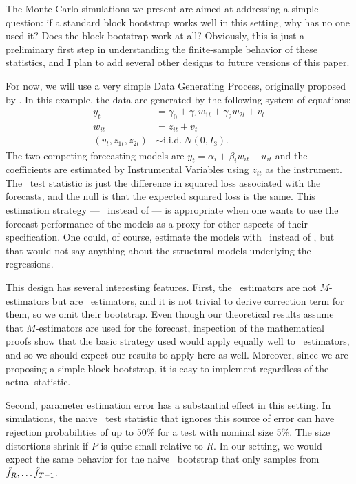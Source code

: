 \documentclass[12pt,fleqn]{article}
\begin{document}
The Monte Carlo simulations we present are aimed at addressing a
simple question: if a standard block bootstrap works well in this
setting, why has no one used it? Does the block bootstrap work at all?
Obviously, this is just a preliminary first step in understanding the
finite-sample behavior of these statistics, and I plan to add several
other designs to future versions of this paper.

For now, we will use a very simple Data Generating Process, originally
proposed by \cite{Wes:96}. In this example, the data are generated by
the following system of equations:
\begin{align*}
  y_t &= \gamma_0 + \gamma_1 w_{1t} + \gamma_2 w_{2t} + v_t \\
  w_{it} &= z_{it} + v_t \\
  (v_t, z_{1t}, z_{2t}) &\sim \text{i.i.d.}\ N(0, I_3).
\end{align*}
The two competing forecasting models are $y_t = \alpha_i + \beta_i
w_{it} + u_{it}$ and the coefficients are estimated by Instrumental
Variables using $z_{it}$ as the instrument. The \oos\ test statistic
is just the difference in squared loss associated with the forecasts,
and the null is that the expected squared loss is the same.  This
estimation strategy --- \iv\ instead of \ols --- is appropriate when
one wants to use the forecast performance
of the models as a proxy for other aspects of their specification. One
could, of course, estimate the models with \ols\ instead of \iv, but
that would not say anything about the structural models underlying the
regressions.

This design has several interesting features. First, the \iv\
estimators are not $M$-estimators but are \gmm\ estimators, and it is
not trivial to derive \citepos{CoS:07} correction term for them, so we
omit their bootstrap. Even though
our theoretical results assume that $M$-estimators are used for the
forecast, inspection of the mathematical proofs show that the basic
strategy used would apply equally well to \gmm\ estimators, and so we
should expect our results to apply here as well. Moreover, since we
are proposing a simple block bootstrap, it is easy to implement
regardless of the actual statistic.

Second, parameter estimation error has a substantial effect in this
setting. In \citepos{Wes:96} simulations, the naive \oos\ test
statistic that ignores this source of error can have rejection
probabilities of up to 50\% for a test with nominal size 5\%. The size
distortions shrink if $P$ is quite small relative to $R$. In our
setting, we would expect the same behavior for the naive \oos\
bootstrap that only samples from $\hat f_R,\dots\hat f_{T-1}$.
\end{document}
